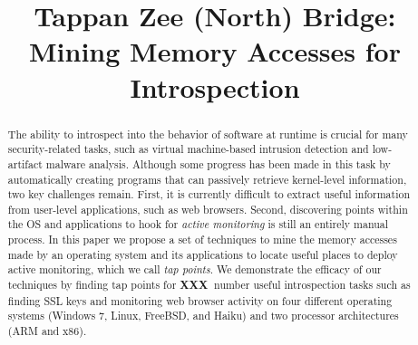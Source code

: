 \documentclass{acm_proc_article-sp}
\newcommand{\fixme}{{\bf XXX\ }}
\begin{document}
\date{}

\title{Tappan Zee (North) Bridge: Mining Memory Accesses for Introspection}

%

\maketitle


\begin{abstract}

The ability to introspect into the behavior of software at runtime is
crucial for many security-related tasks, such as virtual machine-based
intrusion detection and low-artifact malware analysis. Although some
progress has been made in this task by automatically creating programs
that can passively retrieve kernel-level information, two key challenges
remain. First, it is currently difficult to extract useful information
from user-level applications, such as web browsers. Second, discovering
points within the OS and applications to hook for \emph{active
monitoring} is still an entirely manual process. In this paper we
propose a set of techniques to mine the memory accesses made by an
operating system and its applications to locate useful places to deploy
active monitoring, which we call \emph{tap points}. We demonstrate the
efficacy of our techniques by finding tap points for \fixme{number}
useful introspection tasks such as finding SSL keys and monitoring web
browser activity on four different operating systems (Windows 7, Linux,
FreeBSD, and Haiku) and two processor architectures (ARM and x86).

\end{abstract}
\end{document}
